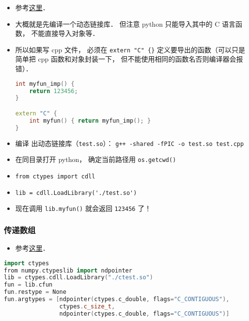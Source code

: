
\begin{issues}
\issueDraft
\end{issues}

\begin{itemize}
\item 参考\href{https://www.geeksforgeeks.org/how-to-call-c-c-from-python/}{这里}．
\item 大概就是先编译一个动态链接库． 但注意 python 只能导入其中的 C 语言函数， 不能直接导入对象等．
\item 所以如果写 cpp 文件， 必须在 \verb|extern "C" {}| 定义要导出的函数（可以只是简单把 cpp 函数和对象封装一下， 但不能使用相同的函数名否则编译器会报错）．
\begin{lstlisting}[language=cpp, caption=test.cpp]
int myfun_imp() {
	return 123456;
}

extern "C" {
	int myfun() { return myfun_imp(); }
}
\end{lstlisting}
\item 编译 出动态链接库（\verb|test.so|）： \verb|g++ -shared -fPIC -o test.so test.cpp|
\item 在同目录打开 python， 确定当前路径用 \verb|os.getcwd()|
\item \verb|from ctypes import cdll|
\item \verb|lib = cdll.LoadLibrary('./test.so')|
\item 现在调用 \verb|lib.myfun()| 就会返回 \verb|123456| 了！
\end{itemize}

\subsubsection{传递数组}
\begin{itemize}
\item 参考\href{https://stackoverflow.com/questions/5862915/passing-numpy-arrays-to-a-c-function-for-input-and-output}{这里}．
\end{itemize}

\begin{lstlisting}[language=cpp]
import ctypes
from numpy.ctypeslib import ndpointer
lib = ctypes.cdll.LoadLibrary("./ctest.so")
fun = lib.cfun
fun.restype = None
fun.argtypes = [ndpointer(ctypes.c_double, flags="C_CONTIGUOUS"),
                ctypes.c_size_t,
                ndpointer(ctypes.c_double, flags="C_CONTIGUOUS")]
\end{lstlisting}
